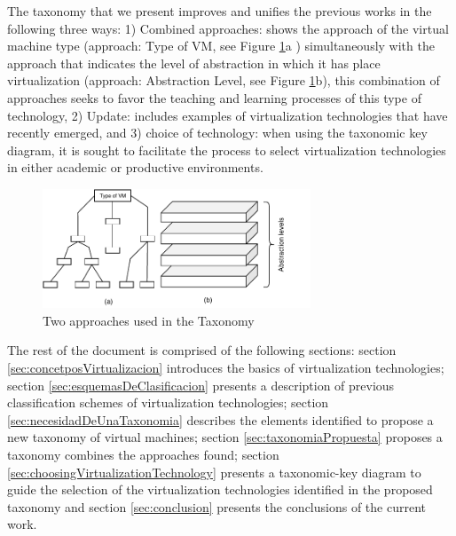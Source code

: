     The taxonomy that we present improves and unifies the previous works in the following three ways: 1) Combined approaches: shows the approach of the virtual machine type (approach: Type of VM, see Figure \ref{fig:twoApproaches}a ) simultaneously with the approach that indicates the level of abstraction in which it has place virtualization (approach: Abstraction Level, see Figure \ref{fig:twoApproaches}b), this combination of approaches seeks to favor the teaching and learning processes of this type of technology, 2) Update: includes examples of virtualization technologies that have recently emerged, and 3) choice of technology: when using the taxonomic key diagram, it is sought to facilitate the process to select virtualization technologies in either academic or productive environments.

	\begin{figure}[!hbtp]
		\centering
		\includegraphics[width=8cm]{images/TwoApproaches.pdf}
		\vspace{-0.2cm}
		\caption{Two approaches used in the Taxonomy}
		\label{fig:twoApproaches}
	\end{figure}	
	
	The rest of the document is comprised of the following sections: section \ref{sec:concetposVirtualizacion} introduces the basics of virtualization technologies; section \ref{sec:esquemasDeClasificacion} presents a description of previous classification schemes of virtualization technologies; section \ref{sec:necesidadDeUnaTaxonomia} describes the elements identified to propose a new taxonomy of virtual machines; section \ref{sec:taxonomiaPropuesta} proposes a taxonomy combines the approaches found; section \ref{sec:choosingVirtualizationTechnology} presents a taxonomic-key diagram to guide the selection of the virtualization technologies identified in the proposed taxonomy and section \ref{sec:conclusion} presents the conclusions of the current work.
	